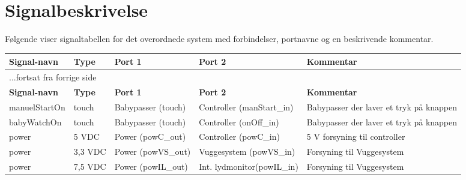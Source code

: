 

\section{Signalbeskrivelse} \label{overordnet:signalbeskrivelse}

Følgende viser  signaltabellen for det overordnede system  med forbindelser, portnavne og en beskrivende kommentar.

\begin{center}
\label{overordnet:signaltabel}
\begin{longtable}{|p{}|p{}|p{}|p{}|p{3cm}|}
\hline
\textbf{Signal-navn}	&\textbf{Type} 		&\textbf{Port 1} 	&\textbf{Port 2} 			&\textbf{Kommentar} \\ \hline
\endfirsthead
\multicolumn{5}{l}{...fortsat fra forrige side} \\ \hline 
\textbf{Signal-navn}	&\textbf{Type} 		&\textbf{Port 1} 	&\textbf{Port 2} 			&\textbf{Kommentar} \\ \hline
\endhead


manuelStartOn
&touch
&Babypasser \newline (touch)
&Controller \newline (manStart\_in)
&Babypasser der laver et tryk på knappen
\\\hline

babyWatchOn
&touch
&Babypasser \newline (touch)
&Controller \newline (onOff\_in)
&Babypasser der laver et tryk på knappen
\\\hline

power
&5 VDC
&Power \newline(powC\_out)
&Controller \newline(powC\_in)
&5 V forsyning til controller
\\\hline

power
&3,3 VDC
&Power \newline(powVS\_out)
&Vuggesystem \newline(powVS\_in)
&Forsyning til Vuggesystem
\\\hline

power
&7,5 VDC
&Power \newline(powIL\_out)
&Int. lydmonitor\newline(powIL\_in)
&Forsyning til Vuggesystem
\\\hline


\end{longtable}
\end{center}
